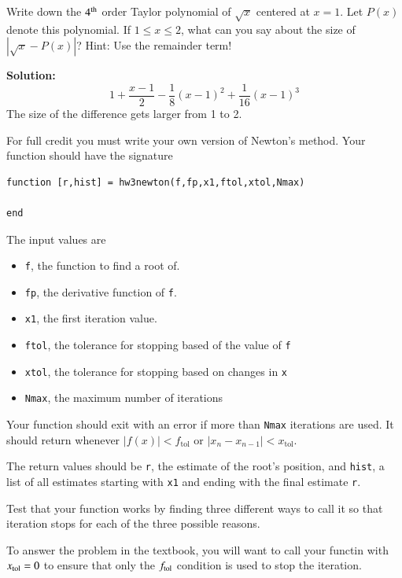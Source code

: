 \documentclass[12pt]{article}
\makeatletter
\theoremstyle{homework}
\newenvironment{exercise}[1]
{\def\@currentlabel{#1}\exercisecore}
{\endexercisecore}
\newcommand{\localhead}[1]{\par\smallskip\noindent\textbf{#1}\nobreak\\}%
\newcommand\solution{\localhead{Solution:}}
\makeatother
\begin{document}
\begin{exercise}{DM 1}
Write down the $4^{\rm th}$ order Taylor
polynomial of $\sqrt{x}$ centered at $x=1$.  Let
$P(x)$ denote this polynomial. If $1\le x \le 2$,
what can you say about the size of $|\sqrt{x}-P(x)|$?
Hint: Use the remainder term!
\end{exercise}
\solution
\begin{equation}
1+\frac{x-1}{2}-\frac{1}{8}(x-1)^2+\frac{1}{16}(x-1)^3
\end{equation}
The size of the difference gets larger from 1 to 2.

\begin{exercise}{Chapter 4: 2 (c)}

For full credit you must write your own version of Newton's method.
Your function should have the signature

\begin{verbatim} 
function [r,hist] = hw3newton(f,fp,x1,ftol,xtol,Nmax)

end
\end{verbatim}

The input values are
\begin{itemize}
\item \texttt{f}, the function to find a root of.
\item \texttt{fp}, the derivative function of \texttt{f}.
\item \texttt{x1}, the first iteration value.
\item \texttt{ftol}, the tolerance for stopping based of the value of \texttt{f}
\item \texttt{xtol}, the tolerance for stopping based on changes in \texttt{x}
\item \texttt{Nmax}, the maximum number of iterations
\end{itemize}

Your function should exit with an error if more than \texttt{Nmax} iterations
are used.  It should return whenever $|f(x)|<f_{\text{tol}}$ or $|x_n-x_{n-1}|<x_{\text{tol}}$.

The return values should be \texttt{r}, the estimate of the root's position,
and \texttt{hist}, a list of all estimates starting with \texttt{x1} and ending with the final estimate \texttt{r}.

Test that your function works by finding three different ways to call it
so that iteration stops for each of the three possible reasons.

To answer the problem in the textbook, you will want to call your functin with 
$x_{\rm tol}=0$ to ensure that only the $f_{\rm tol}$ condition is used
to stop the iteration.
\end{exercise}
\end{document}
